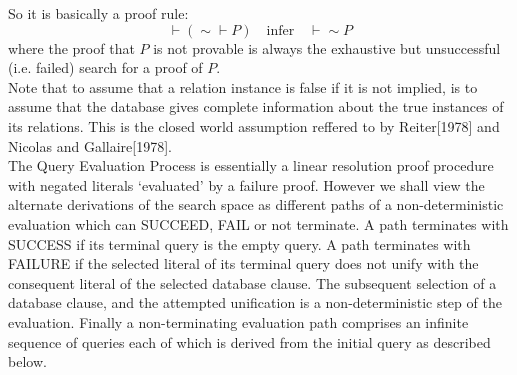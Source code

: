 \documentclass{article}
\begin{document}
So it is basically a proof rule:
\[\vdash ({\sim}\vdash P) \quad \text{infer} \quad \vdash {\sim} P\]
where the proof that $P$ is not provable is always the exhaustive but unsuccessful (i.e. failed) search for a proof of $P$. \\

Note that to assume that a relation instance is false if it is not implied, is to assume that the database gives complete information about the true instances of its relations. This is the closed world assumption reffered to by Reiter[1978] and Nicolas and Gallaire[1978].\\

The Query Evaluation Process is essentially a linear resolution proof procedure with negated literals `evaluated' by a failure proof. However we shall view the alternate derivations of the search space as different paths of a non-deterministic evaluation which can SUCCEED, FAIL or not terminate. A path terminates with SUCCESS if its terminal query is the empty query. A path terminates with FAILURE if the selected literal of its terminal query does not unify with the consequent literal of the selected database clause. The subsequent selection of a database clause, and the attempted unification is a non-deterministic step of the evaluation. Finally a non-terminating evaluation path comprises an infinite sequence of queries each of which is derived from the initial query as described below.\\
\end{document}
